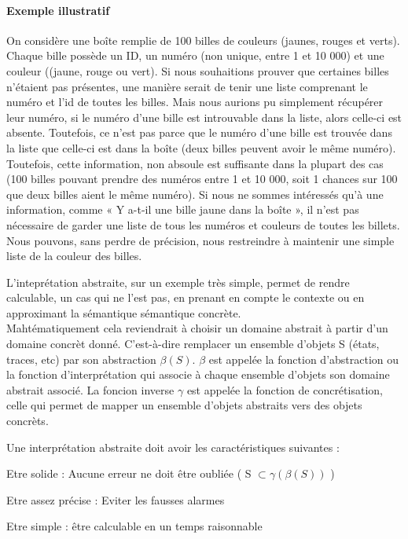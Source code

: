 \documentclass[french]{report}
\begin{document}
\paragraph{Exemple illustratif}
On considère une boîte remplie de 100 billes de couleurs (jaunes, rouges et verts).
Chaque bille possède un ID, un numéro (non unique, entre 1 et 10 000)
et une couleur ((jaune, rouge ou vert).
Si nous souhaitions prouver que certaines billes n'étaient pas présentes, une manière serait
de tenir une liste comprenant le numéro et l'id de toutes les billes.
Mais nous aurions pu simplement récupérer leur numéro, si le numéro d'une bille est introuvable dans la liste,
alors celle-ci est absente. Toutefois, ce n'est pas parce que le numéro d'une bille est
trouvée dans la liste que celle-ci est dans la boîte (deux billes peuvent avoir le
même numéro). Toutefois, cette information, non absoule est suffisante dans la plupart
des cas (100 billes pouvant prendre des numéros entre 1 et 10 000, soit 1 chances sur 100 que deux billes aient
le même numéro).
Si nous ne sommes intéressés qu'à une information,
comme « Y a-t-il une bille jaune dans la boîte », il n'est
pas nécessaire de garder une liste de tous les numéros et couleurs de toutes les billets.
Nous pouvons, sans perdre de précision, nous
restreindre à maintenir une simple liste de la couleur des billes.

L'inteprétation abstraite, sur un exemple très simple, permet de rendre calculable, un cas qui ne l'est pas,
en prenant en compte le contexte ou en approximant la sémantique sémantique concrète. \\

Mahtématiquement cela reviendrait à choisir un domaine abstrait à partir d'un domaine concrèt donné. C'est-à-dire remplacer un ensemble d'objets S (états, traces, etc) par son abstraction $\beta(S)$. $\beta$ est appelée la fonction d'abstraction ou la fonction d'interprétation qui associe à chaque ensemble d'objets son domaine abstrait associé. La foncion inverse $\gamma$ est appelée la fonction de concrétisation, celle qui permet de mapper un ensemble d'objets abstraits vers des objets concrèts.

Une interprétation abstraite doit avoir les caractéristiques suivantes :
\begin{description}
    \item Etre solide : Aucune erreur ne doit être oubliée ( S $\subset \gamma(\beta(S))$ )
    \item Etre assez précise : Eviter les fausses alarmes
    \item Etre simple : être calculable en un temps raisonnable 
\end{description}
\end{document}

